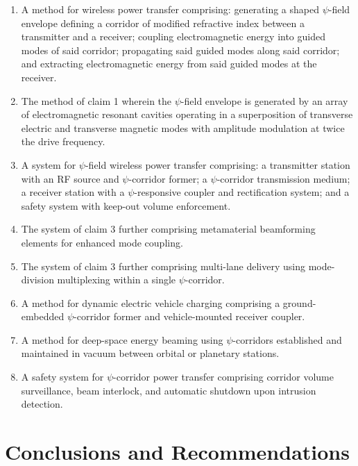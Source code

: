 \documentclass[11pt,a4paper]{article}
\begin{document}
\begin{enumerate}
\item A method for wireless power transfer comprising: generating a shaped
$\psi$-field envelope defining a corridor of modified refractive index between
a transmitter and a receiver; coupling electromagnetic energy into guided modes
of said corridor; propagating said guided modes along said corridor; and
extracting electromagnetic energy from said guided modes at the receiver.

\item The method of claim 1 wherein the $\psi$-field envelope is generated by
an array of electromagnetic resonant cavities operating in a superposition of
transverse electric and transverse magnetic modes with amplitude modulation at
twice the drive frequency.

\item A system for $\psi$-field wireless power transfer comprising: a transmitter
station with an RF source and $\psi$-corridor former; a $\psi$-corridor
transmission medium; a receiver station with a $\psi$-responsive coupler and
rectification system; and a safety system with keep-out volume enforcement.

\item The system of claim 3 further comprising metamaterial beamforming elements
for enhanced mode coupling.

\item The system of claim 3 further comprising multi-lane delivery using
mode-division multiplexing within a single $\psi$-corridor.

\item A method for dynamic electric vehicle charging comprising a
ground-embedded $\psi$-corridor former and vehicle-mounted receiver coupler.

\item A method for deep-space energy beaming using $\psi$-corridors established
and maintained in vacuum between orbital or planetary stations.

\item A safety system for $\psi$-corridor power transfer comprising corridor
volume surveillance, beam interlock, and automatic shutdown upon intrusion
detection.
\end{enumerate}

\section{Conclusions and Recommendations}
\end{document}
